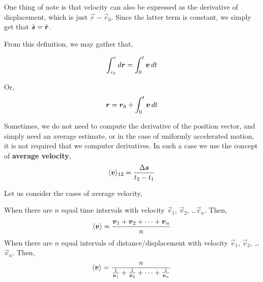One thing of note is that velocity can also be expressed as the derivative of 
displacement, which is just \(\vec{r} - \vec{r}_0\). Since the latter 
term is constant, we simply get that \(\dot{\boldsymbol{s}} = \dot{\boldsymbol{r}}\).

From this definition, we may gather that,

\[\int_{r_0}^{r} \mathop{}\!{d}{\boldsymbol{r}} = \int_{0}^{t} \boldsymbol{v} \mathop{}\!{d}{t}\]

Or, 
\begin{equation}
    \boldsymbol{r} = \boldsymbol{r}_0 + \int_{0}^{t} \boldsymbol{v} \mathop{}\!{d}{t}
\end{equation}

Sometimes, we do not need to compute the derivative of the position vector, and simply need an average
estimate, or in the case of uniformly accelerated motion, it is not required that we computer derivatives.
In such a case we use the concept of \textbf{average velocity}, \[
    \langle\boldsymbol{v}\rangle_{12} = \frac{\Delta\boldsymbol{s}}{t_2 - t_1}  
\]


\begin{algorithm}
    Let us consider the cases of average velocity,
    \begin{casework}
        \ii When there are \(n\) equal time intervals with velocity \(\vec{v}_1\), \(\vec{v}_2\), \ldots \(\vec{v}_n\).
        Then, \[
            \langle\boldsymbol{v}\rangle = \frac{\boldsymbol{v}_1 + \boldsymbol{v}_2 + \dots + \boldsymbol{v}_n}{n} 
        \]
        \ii When there are \(n\) equal intervals of distance/displacement with velocity \(\vec{v}_1\), \(\vec{v}_2\), \ldots \(\vec{v}_n\).
        Then, \[
            \langle\boldsymbol{v}\rangle = \frac{n}{\frac{1}{\boldsymbol{v}_1} + \frac{1}{\boldsymbol{v}_2} + \dots + \frac{1}{\boldsymbol{v}_n}} 
        \]
    \end{casework}
\end{algorithm}



